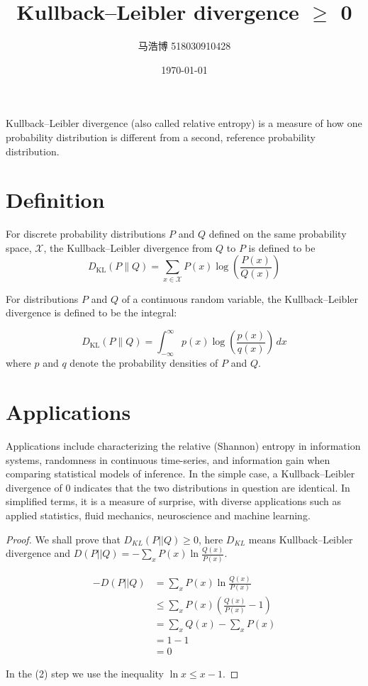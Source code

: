 \documentclass[12pt]{article}
\title{Kullback–Leibler divergence $\ge$ 0}
\author{马浩博 518030910428}
\date{\today}
\theoremstyle{mythm}
\begin{document}
\maketitle

Kullback–Leibler divergence (also called relative entropy) is a measure of how one probability distribution is different from a second, reference probability distribution. 
\section*{Definition}
For discrete probability distributions $P$ and $Q$ defined on the same probability space, ${\mathcal {X}}$, the Kullback–Leibler divergence from $Q$ to $P$ is defined to be
$$D_{\text{KL}}(P\parallel Q)=\sum _{x\in {\mathcal {X}}}P(x)\log \left({\frac {P(x)}{Q(x)}}\right)$$

For distributions $P$ and $Q$ of a continuous random variable, the Kullback–Leibler divergence is defined to be the integral:

$$D_{\text{KL}}(P\parallel Q)=\int _{-\infty }^{\infty }p(x)\log \left({\frac {p(x)}{q(x)}}\right)\,dx$$
where $p$ and $q$ denote the probability densities of $P$ and $Q$.

\section*{Applications}
Applications include characterizing the relative (Shannon) entropy in information systems, randomness in continuous time-series, and information gain when comparing statistical models of inference. In the simple case, a Kullback–Leibler divergence of 0 indicates that the two distributions in question are identical. In simplified terms, it is a measure of surprise, with diverse applications such as applied statistics, fluid mechanics, neuroscience and machine learning.

\begin{proof}
	We shall prove that $D_{KL}(P||Q) \ge 0$, here $D_{KL}$ means Kullback–Leibler divergence and $D(P||Q)=-\sum_x P(x)\ln \frac{Q(x)}{P(x)}$. 
	
	\begin{align}
	-D(P||Q)&= \sum_x P(x)\ln \frac{Q(x)}{P(x)}\\
	&\stackrel{}{\leq} \sum_x P(x)\left(\frac{Q(x)}{P(x)}-1\right)\\
	&=\sum_x Q(x) - \sum_x P(x)\\
	&= 1 - 1\\
	&= 0
	\end{align}
	
	In the (2) step we use the inequality $\ln x \leq x-1$.
\end{proof}
\end{document}

